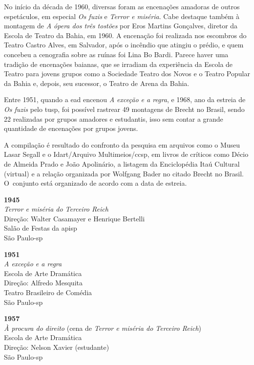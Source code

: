 No início da década de 1960, diversas foram as encenações amadoras de
outros espetáculos, em especial {\it Os fuzis} e {\it Terror e miséria}.
Cabe destaque também à montagem de {\it A ópera dos três tostões} por
Eros Martins Gonçalves, diretor da Escola de Teatro da Bahia, em 1960. A
encenação foi realizada nos escombros do Teatro Castro Alves, em
Salvador, após o incêndio que atingiu o prédio, e quem concebeu a
cenografia sobre as ruínas foi Lina Bo Bardi. Parece haver uma tradição
de encenações baianas, que se irradiam da experiência da Escola de
Teatro para jovens grupos como a Sociedade Teatro dos Novos e o Teatro
Popular da Bahia e, depois, seu sucessor, o Teatro de Arena da Bahia.

Entre 1951, quando a {\sc ead} encenou {\it A exceção e a regra}, e 1968, ano
da estreia de {\it Os fuzis} pelo {\sc tusp}, foi possível rastrear 49
montagens de Brecht no Brasil, sendo 22 realizadas por grupos amadores e
estudantis, isso sem contar a grande quantidade de encenações por grupos
jovens.

A compilação é resultado do confronto da pesquisa em arquivos como o
Museu Lasar Segall e o Idart/Arquivo Multimeios/{\sc ccsp}, em livros de
críticos como Décio de Almeida Prado e João Apolinário, a listagem da
Enciclopédia Itaú Cultural (virtual) e a relação organizada por Wolfgang
Bader no citado Brecht no Brasil. O~conjunto está organizado de acordo
com a data de estreia.

\start[itemize]
\item{\bf 1945}\\
{\it Terror e miséria do Terceiro Reich}\\
Direção: Walter Casamayer e Henrique Bertelli\\
Salão de Festas da {\sc apisp}\\
São Paulo-{\sc sp}

\item{\bf 1951}\\
{\it A exceção e a regra}\\
Escola de Arte Dramática\\
Direção: Alfredo Mesquita\\
Teatro Brasileiro de Comédia\\
São Paulo-{\sc sp}

\item{\bf 1957}\\
{\it À procura do direito} (cena de {\it Terror e miséria do Terceiro
Reich})\\
Escola de Arte Dramática\\
Direção: Nelson Xavier (estudante)\\
São Paulo-{\sc sp}

